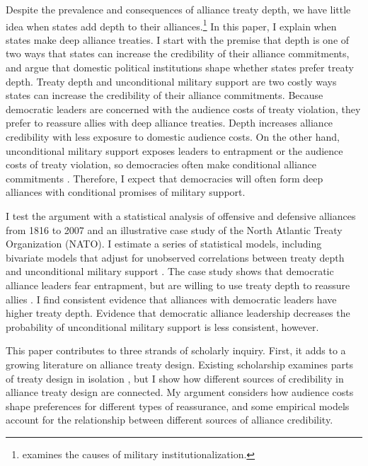 \documentclass[12pt]{article}
\begin{document}
Despite the prevalence and consequences of alliance treaty depth, we have little idea when states add depth to their alliances.\footnote{\citet{Mattes2012} examines the causes of military institutionalization.}
In this paper, I explain when states make deep alliance treaties.
I start with the premise that depth is one of two ways that states can increase the credibility of their alliance commitments, and argue that domestic political institutions shape whether states prefer treaty depth.
Treaty depth and unconditional military support are two costly ways states can increase the credibility of their alliance commitments.
Because democratic leaders are concerned with the audience costs of treaty violation, they prefer to reassure allies with deep alliance treaties.
Depth increases alliance credibility with less exposure to domestic audience costs. 
On the other hand, unconditional military support exposes leaders to entrapment or the audience costs of treaty violation, so democracies often make conditional alliance commitments \citep{Mattes2012, Chibaetal2015}.
Therefore, I expect that democracies will often form deep alliances with conditional promises of military support. 


I test the argument with a statistical analysis of offensive and defensive alliances from 1816 to 2007 and an illustrative case study of the North Atlantic Treaty Organization (NATO).
I estimate a series of statistical models, including bivariate models that adjust for unobserved correlations between treaty depth and unconditional military support \citep{Braumoelleretal2018}. 
The case study shows that democratic alliance leaders fear entrapment, but are willing to use treaty depth to reassure allies \citep{SeawrightGerring2008, Seawright2016}. 
I find consistent evidence that alliances with democratic leaders have higher treaty depth.
Evidence that democratic alliance leadership decreases the probability of unconditional military support is less consistent, however. 


This paper contributes to three strands of scholarly inquiry.
First, it adds to a growing literature on alliance treaty design.  
Existing scholarship examines parts of treaty design in isolation \citep{Benson2012, Mattes2012, Chibaetal2015}, but I show how different sources of credibility in alliance treaty design are connected. 
My argument considers how audience costs shape preferences for different types of reassurance, and some empirical models account for the relationship between different sources of alliance credibility. 
\end{document}
